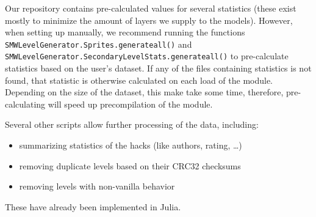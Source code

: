 Our repository contains pre-calculated values for several statistics
(these exist mostly to minimize the amount of layers we supply to the
models). However, when setting up manually, we recommend running the
functions \texttt{SMWLevelGenerator.Sprites.generateall()} and
\texttt{SMWLevelGenerator.SecondaryLevelStats.generateall()} to
pre-calculate statistics based on the user's dataset. If any of the
files containing statistics is not found, that statistic is otherwise
calculated on each load of the module. Depending on the size of the
dataset, this make take some time, therefore, pre-calculating will
speed up precompilation of the module.

Several other scripts allow further processing of the data, including:
\begin{itemize}
\item summarizing statistics of the hacks (like authors, rating,
  \dots)
\item removing duplicate levels based on their CRC32 checksums
\item removing levels with non-vanilla behavior
\end{itemize}
These have already been implemented in Julia.


